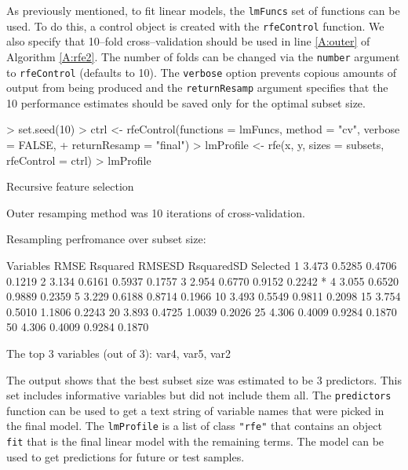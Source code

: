 \documentclass[12pt]{article}
\begin{document}
As previously mentioned, to fit linear models, the \texttt{lmFuncs} set of functions can be used. To do this, a control object is created with the \texttt{rfeControl} function. We also specify that 10--fold cross--validation should be used in line \ref{A:outer} of Algorithm  \ref{A:rfe2}. The number of folds can be changed via the \texttt{number} argument to \texttt{rfeControl} (defaults to 10). The \texttt{verbose} option prevents copious amounts of output from being produced and the \texttt{returnResamp} argument specifies that the 10 performance estimates should be saved only for the optimal subset size.

\begin{Schunk}
\begin{Sinput}
> set.seed(10)
> ctrl <- rfeControl(functions = lmFuncs, method = "cv", verbose = FALSE, 
+     returnResamp = "final")
> lmProfile <- rfe(x, y, sizes = subsets, rfeControl = ctrl)
> lmProfile
\end{Sinput}
\begin{Soutput}
Recursive feature selection

Outer resamping method was 10 iterations of cross-validation. 

Resampling perfromance over subset size:

 Variables  RMSE Rsquared RMSESD RsquaredSD Selected
         1 3.473   0.5285 0.4706     0.1219         
         2 3.134   0.6161 0.5937     0.1757         
         3 2.954   0.6770 0.9152     0.2242        *
         4 3.055   0.6520 0.9889     0.2359         
         5 3.229   0.6188 0.8714     0.1966         
        10 3.493   0.5549 0.9811     0.2098         
        15 3.754   0.5010 1.1806     0.2243         
        20 3.893   0.4725 1.0039     0.2026         
        25 4.306   0.4009 0.9284     0.1870         
        50 4.306   0.4009 0.9284     0.1870         

The top 3 variables (out of 3):
   var4, var5, var2
\end{Soutput}
\end{Schunk}
The output shows that the  best subset size was estimated to be 3 predictors. This set includes informative variables but did not include them all. The \texttt{predictors} function can be used to get a text string of variable names that were picked in the final model. The \texttt{lmProfile} is a list of class \texttt{"rfe"} that contains an object \texttt{fit} that is the final linear model with the remaining terms. The model can be used to get predictions for future or test samples. 
\end{document}
